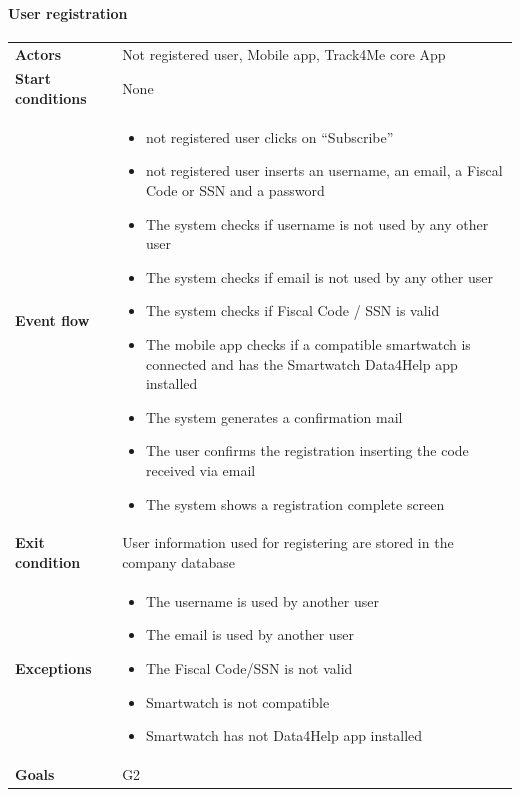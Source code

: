 \paragraph{User registration}
\begin{center}
\begin{table}[H]
\centering
\begin{tabular}{l|p{}}
\textbf{Actors} & Not registered user, Mobile app, Track4Me core App \\
\textbf{Start conditions} & None \\
\textbf{Event flow}  & 


 \begin{minipage}[t] {0.7\textwidth} 
 \begin{itemize}
      \item  not registered user clicks on “Subscribe”
      \item not registered user inserts an username, an email, a Fiscal Code or SSN and a password
      \item The system checks if username is not used by any other user
      \item The system checks if email is not used by any other user
      \item The system checks if Fiscal Code / SSN is valid
      \item The mobile app checks if a compatible smartwatch is connected and has the Smartwatch Data4Help app installed
      \item The system generates a confirmation mail
      \item The user confirms the registration inserting the code received via email 
      \item The system shows a registration complete screen
  \end{itemize}
\end{minipage}
 \\
\textbf{Exit condition} & User information used for registering are stored in the company database \\
\textbf{Exceptions} & 
\begin{minipage}[t] {0.7\textwidth} 
 \begin{itemize}
 
 \item The username is used by another user
\item The email is used by another user
\item The Fiscal Code/SSN is not valid
\item Smartwatch is not compatible
\item Smartwatch has not Data4Help app installed
\end{itemize}
 \end{minipage}\\
\textbf{Goals} & G2 
\end{tabular}

\end{table}
\end{center}


